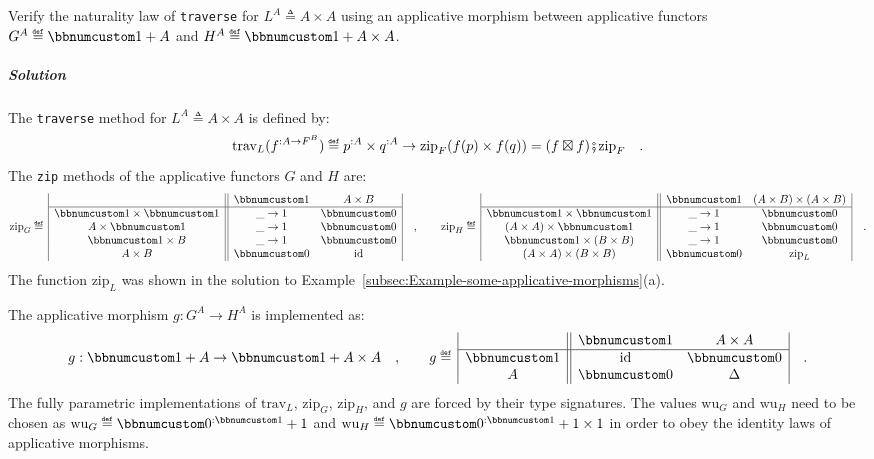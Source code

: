 Verify the naturality law of \lstinline!traverse! for $L^{A}\triangleq A\times A$
using an applicative morphism between applicative functors $G^{A}\triangleq\bbnum 1+A$
and $H^{A}\triangleq\bbnum 1+A\times A$. 

\subparagraph{Solution}

The \lstinline!traverse! method for $L^{A}\triangleq A\times A$
is defined by:
\[
\text{trav}_{L}(f^{:A\rightarrow F^{B}})\triangleq p^{:A}\times q^{:A}\rightarrow\text{zip}_{F}(f(p)\times f(q))=(f\boxtimes f)\bef\text{zip}_{F}\quad.
\]
The \lstinline!zip! methods of the applicative functors $G$ and
$H$ are:
\[
\text{zip}_{G}\triangleq\,\begin{array}{|c||cc|}
 & \bbnum 1 & A\times B\\
\hline \bbnum 1\times\bbnum 1 & \_\rightarrow1 & \bbnum 0\\
A\times\bbnum 1 & \_\rightarrow1 & \bbnum 0\\
\bbnum 1\times B & \_\rightarrow1 & \bbnum 0\\
A\times B & \bbnum 0 & \text{id}
\end{array}\quad,\quad\quad\text{zip}_{H}\triangleq\,\begin{array}{|c||cc|}
 & \bbnum 1 & (A\times B)\times(A\times B)\\
\hline \bbnum 1\times\bbnum 1 & \_\rightarrow1 & \bbnum 0\\
(A\times A)\times\bbnum 1 & \_\rightarrow1 & \bbnum 0\\
\bbnum 1\times(B\times B) & \_\rightarrow1 & \bbnum 0\\
(A\times A)\times(B\times B) & \bbnum 0 & \text{zip}_{L}
\end{array}\quad.
\]
The function $\text{zip}_{L}$ was shown in the solution to Example~\ref{subsec:Example-some-applicative-morphisms}(a). 

The applicative morphism $g:G^{A}\rightarrow H^{A}$ is implemented
as:
\[
g:\bbnum 1+A\rightarrow\bbnum 1+A\times A\quad,\quad\quad g\triangleq\,\begin{array}{|c||cc|}
 & \bbnum 1 & A\times A\\
\hline \bbnum 1 & \text{id} & \bbnum 0\\
A & \bbnum 0 & \Delta
\end{array}\quad.
\]
The fully parametric implementations of $\text{trav}_{L}$, $\text{zip}_{G}$,
$\text{zip}_{H}$, and $g$ are forced by their type signatures. The
values $\text{wu}_{G}$ and $\text{wu}_{H}$ need to be chosen as
$\text{wu}_{G}\triangleq\bbnum 0^{:\bbnum 1}+1$ and $\text{wu}_{H}\triangleq\bbnum 0^{:\bbnum 1}+1\times1$
in order to obey the identity laws of applicative morphisms.

